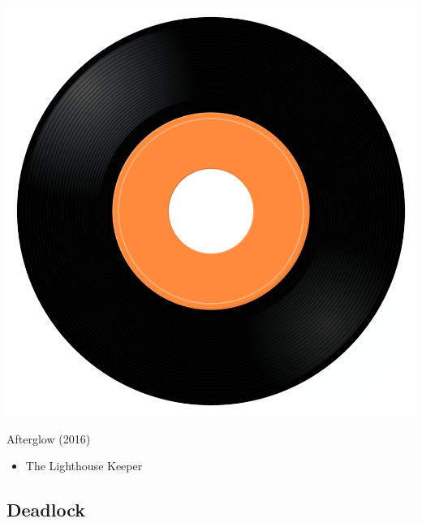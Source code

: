 \begin{minipage}[t]{0.25\textwidth}\vspace{0pt}
\captionsetup{type=figure}
\includegraphics[width=\textwidth]{Images/cover.png}
\caption*{Afterglow (2016)}
\end{minipage}
\begin{minipage}[t]{0.25\textwidth}\vspace{0pt}
\begin{itemize}[nosep,leftmargin=1em,labelwidth=*,align=left]
	\setlength{\itemsep}{0pt}
	\item The Lighthouse Keeper
\end{itemize}
\end{minipage}

\subsection{Deadlock}

